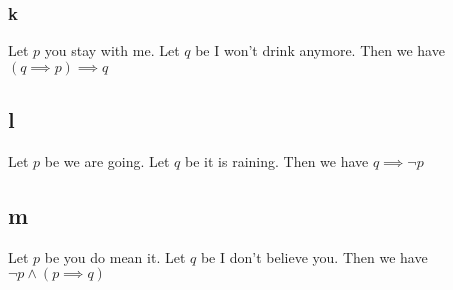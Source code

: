 \documentclass[12pt]{article}
\begin{document}
\subsubsection{k}
Let $p$ you stay with me.
\newline
Let $q$ be I won't drink anymore.
\newline
Then we have $(q \implies p) \implies q$

\subsection{l}
Let $p$ be we are going.
\newline
Let $q$ be it is raining.
\newline
Then we have $q \implies \neg p$

\subsection{m}
Let $p$ be you do mean it.
\newline
Let $q$ be I don't believe you.
\newline
Then we have $\neg p \land (p \implies q)$
\end{document}
